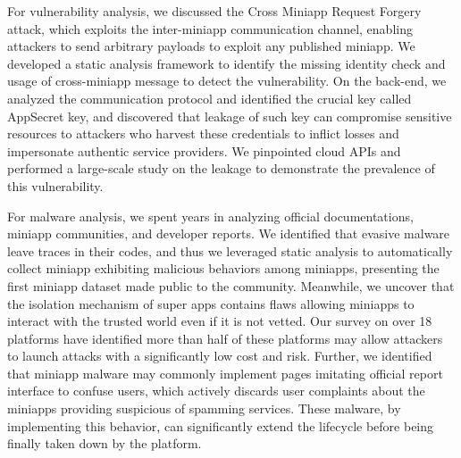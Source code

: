 \documentclass{osudissert96}
\begin{document}
For vulnerability analysis, we discussed the Cross Miniapp Request Forgery attack, which exploits the inter-miniapp communication channel, enabling attackers to send arbitrary payloads to exploit any published miniapp. We developed a static analysis framework to identify the missing identity check and usage of cross-miniapp message to detect the vulnerability. On the back-end, we analyzed the communication protocol and identified the crucial key called AppSecret key, and discovered that leakage of such key can compromise sensitive resources to attackers who harvest these credentials to inflict losses and impersonate authentic service providers. We pinpointed cloud APIs and performed a large-scale study on the leakage to demonstrate the prevalence of this vulnerability.

For malware analysis, we spent years in analyzing official documentations, miniapp communities, and developer reports. We identified that evasive malware leave traces in their codes, and thus we leveraged static analysis to automatically collect miniapp exhibiting malicious behaviors among miniapps, presenting the first miniapp dataset made public to the community. Meanwhile, we uncover that the isolation mechanism of super apps contains flaws allowing miniapps to interact with the trusted world even if it is not vetted. Our survey on over 18 platforms have identified more than half of these platforms may allow attackers to launch attacks with a significantly low cost and risk. Further, we identified that miniapp malware may commonly implement pages imitating official report interface to confuse users, which actively discards user complaints about the miniapps providing suspicious of spamming services. These malware, by implementing this behavior, can significantly extend the lifecycle before being finally taken down by the platform.


\begin{landscape}
  
\end{landscape}
\end{document}
